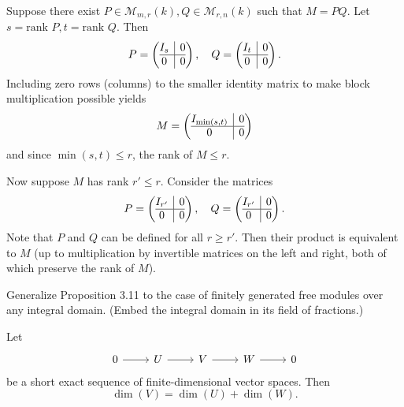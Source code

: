 \documentclass[../../master.tex]{subfiles}
\begin{document}
\begin{solution}
    Suppose there exist $P \in \mathcal{M}_{m,r}(k), Q \in \mathcal{M}_{r,n}(k)$ such that $M = PQ$.
    Let $s = \text{rank } P, t = \text{rank } Q$.
    Then
    \[
    P = 
        \left(
            \begin{array}{@{}c|c@{}}
                I_{s} & 0 \\
                \hline
                0 & 0
            \end{array}
        \right), \quad
    Q = 
        \left(
            \begin{array}{@{}c|c@{}}
                I_{t} & 0 \\
                \hline
                0 & 0
            \end{array}
        \right).
    \]
    Including zero rows (columns) to the smaller identity matrix to make block multiplication possible yields
    \[
    M =
        \left(
            \begin{array}{@{}c|c@{}}
                I_{\min(s, t)} & 0 \\
                \hline
                0 & 0
            \end{array}
        \right)
    \]
    and since $\min(s, t) \leq r$, the rank of $M \leq r$.

    Now suppose $M$ has rank $r' \leq r$.
    Consider the matrices
    \[
    P =
        \left(
            \begin{array}{@{}c|c@{}}
                I_{r'} & 0 \\
                \hline
                0 & 0
            \end{array}
        \right), \quad
    Q = 
        \left(
            \begin{array}{@{}c|c@{}}
                I_{r'} & 0 \\
                \hline
                0 & 0
            \end{array}
        \right).
    \]
    Note that $P$ and $Q$ can be defined for all $r \geq r'$.
    Then their product is equivalent to $M$ (up to multiplication by invertible matrices on the left and right, both of which preserve the rank of $M$).
\end{solution}

\begin{problem}
    Generalize Proposition 3.11 to the case of finitely generated free modules over any integral domain.
    (Embed the integral domain in its field of fractions.)
    \begin{proposition}[Proposition 3.11] 
        Let
	\[
	\begin{tikzcd}
	    0 & U & V & W & 0
	    \arrow[from=1-1, to=1-2]
	    \arrow[from=1-2, to=1-3]
	    \arrow[from=1-3, to=1-4]
	    \arrow[from=1-4, to=1-5]
	\end{tikzcd}
	\]
    be a short \textup{exact} sequence of finite-dimensional vector spaces.
    Then
    \[
        \dim(V) = \dim(U) + \dim(W).
    \]
    
    \end{proposition}
\end{problem}
\end{document}
